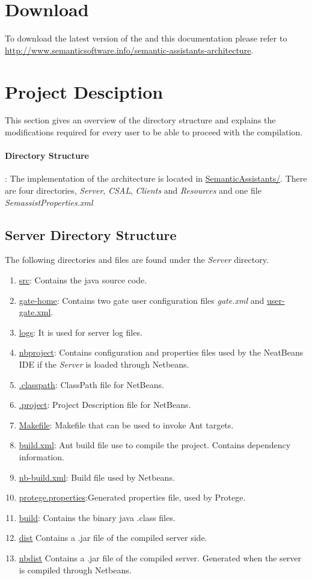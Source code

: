 \section{Download}
To download the latest version of the \sa and this documentation
please refer to
\url{http://www.semanticsoftware.info/semantic-assistants-architecture}.

\section{Project Desciption}
This section gives an overview of the directory structure and explains the modifications
required for every user to be able to proceed with the compilation.

\paragraph{Directory Structure}:
The implementation of the architecture is located in
\url{SemanticAssistants/}. There are four directories, \emph{Server},
\emph{CSAL}, \emph{Clients} and \emph{Resources} and one file \emph{SemassistProperties.xml}

\subsection{Server Directory Structure}
The following directories and files are found under the \emph{Server} directory.

\begin{enumerate}
\item \url{src}: Contains the java source code.
\item \url{gate-home}: Contains two gate user configuration files \emph{gate.xml} and \url{user-gate.xml}.
\item \url{logs}: It is used for server log files.
\item \url{nbproject}: Contains configuration and properties files used by the NeatBeans IDE if the \emph{Server} is loaded through Netbeans.
\item \url{.classpath}: ClassPath file for NetBeans.
\item \url{.project}: Project Description file for NetBeans.
\item \url{Makefile}: Makefile that can be used to invoke Ant targets.
\item \url{build.xml}: Ant build file use to compile the project. Contains dependency information.
\item \url{nb-build.xml}: Build file used by Netbeans.
\item \url{protege.properties}:Generated properties file, used by Protege.
\item \url{build}: Contains the binary java .class files.
\item \url{dist} Contains a .jar file of the compiled server side.
\item \url{nbdist} Contains a .jar file of the compiled server. Generated when the server is compiled through Netbeans.
\end{enumerate}


